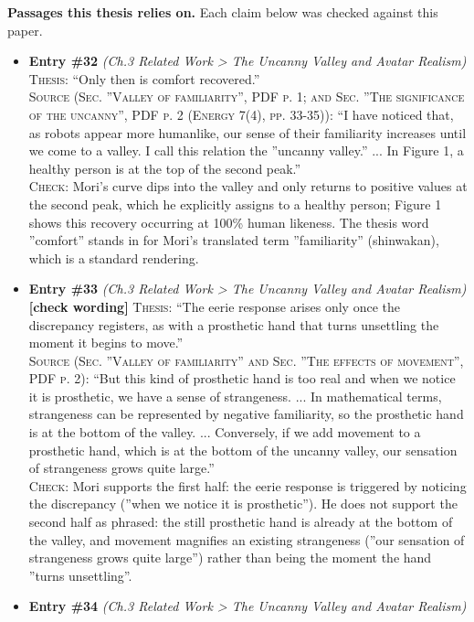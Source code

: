 \documentclass[11pt, a4paper]{article}
\begin{document}
\textbf{Passages this thesis relies on.} Each claim below was checked against this paper.
\begin{itemize}[leftmargin=1.2em,itemsep=4pt]
\item \textbf{Entry \#32} \textit{(Ch.3 Related Work > The Uncanny Valley and Avatar Realism)}\\
\textsc{Thesis:} ``Only then is comfort recovered.''\\
\textsc{Source (Sec. ”Valley of familiarity”, PDF p. 1; and Sec. ”The significance of the uncanny”, PDF p. 2 (Energy 7(4), pp. 33-35)):} ``I have noticed that, as robots appear more humanlike, our sense of their familiarity increases until we come to a valley. I call this relation the ”uncanny valley.” ... In Figure 1, a healthy person is at the top of the second peak.''\\
\textsc{Check:} Mori's curve dips into the valley and only returns to positive values at the second peak, which he explicitly assigns to a healthy person; Figure 1 shows this recovery occurring at 100\% human likeness. The thesis word ”comfort” stands in for Mori's translated term ”familiarity” (shinwakan), which is a standard rendering.
\item \textbf{Entry \#33} \textit{(Ch.3 Related Work > The Uncanny Valley and Avatar Realism)}\\
\textcolor{partialorange}{\textbf{[check wording]}} \textsc{Thesis:} ``The eerie response arises only once the discrepancy registers, as with a prosthetic hand that turns unsettling the moment it begins to move.''\\
\textsc{Source (Sec. ”Valley of familiarity” and Sec. ”The effects of movement”, PDF p. 2):} ``But this kind of prosthetic hand is too real and when we notice it is prosthetic, we have a sense of strangeness. ... In mathematical terms, strangeness can be represented by negative familiarity, so the prosthetic hand is at the bottom of the valley. ... Conversely, if we add movement to a prosthetic hand, which is at the bottom of the uncanny valley, our sensation of strangeness grows quite large.''\\
\textsc{Check:} Mori supports the first half: the eerie response is triggered by noticing the discrepancy (”when we notice it is prosthetic”). He does not support the second half as phrased: the still prosthetic hand is already at the bottom of the valley, and movement magnifies an existing strangeness (”our sensation of strangeness grows quite large”) rather than being the moment the hand ”turns unsettling”.
\item \textbf{Entry \#34} \textit{(Ch.3 Related Work > The Uncanny Valley and Avatar Realism)}\\

\end{itemize}
\end{document}
